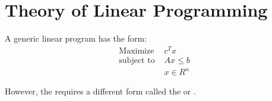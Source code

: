 \chapter{Theory of Linear Programming}

    \par A generic linear program has the form:
      \begin{align*}
        \text{Maximize } & c^T x \\
        \text{subject to } & Ax \leq b \\
        & x \in R^n
      \end{align*}

    \par However, the  requires a different form called the  or .

    \par {}

